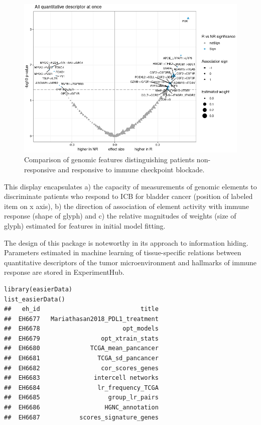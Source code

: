 \begin{figure}
\includegraphics[width=0.95\linewidth,]{easierFinal} \caption{Comparison of genomic features distinguishing patients non-responsive and responsive to immune checkpoint blockade.}\label{fig:easfin}
\end{figure}

This display encapsulates a) the capacity of measurements of
genomic elements to discriminate patients who respond
to ICB for bladder cancer (position of labeled
item on x axis), b) the direction of association of
element activity with immune response (shape of glyph) and c) the
relative magnitudes of weights (size of glyph) estimated for features in
initial model fitting.

The design of this package is noteworthy in its approach
to information hiding. Parameters estimated in machine
learning of tissue-specific relations between quantitative
descriptors of the tumor microenvironment and hallmarks
of immune response are stored in ExperimentHub.

\begin{shaded}
\begin{verbatim}
library(easierData)
list_easierData()
##   eh_id                            title
##  EH6677   Mariathasan2018_PDL1_treatment
##  EH6678                       opt_models
##  EH6679                 opt_xtrain_stats
##  EH6680              TCGA_mean_pancancer
##  EH6681                TCGA_sd_pancancer
##  EH6682                 cor_scores_genes
##  EH6683               intercell networks
##  EH6684                lr_frequency_TCGA
##  EH6685                   group_lr_pairs
##  EH6686                  HGNC_annotation
##  EH6687           scores_signature_genes
\end{verbatim}
\end{shaded}

